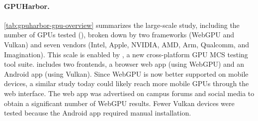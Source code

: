 \begin{table}
\centering
\footnotesize
\caption[GPUHarbor vendors and devices.]{The GPU vendors and devices included in the GPUHarbor study. Overall, almost 400 billion iterations of weak memory tests were run on \totalDevices devices, of which \uniqueDevices were confirmed to be unique models. Over 35 million weak behaviors were observed, with the rates per device and vendor characterized in \mysec\ref{sec:gpuharbor-wb-char}.}
\label{tab:gpuharbor-gpu-overview}
\end{table}

\paragraph{GPUHarbor.} \mytablong\ref{tab:gpuharbor-gpu-overview} summarizes the large-scale study, including the number of GPUs tested (\totalDevices), broken down by two frameworks (WebGPU and Vulkan) and seven vendors (Intel, Apple, NVIDIA, AMD, Arm, Qualcomm, and Imagination). This scale is enabled by \gpuharbor, a new cross-platform GPU MCS testing tool suite. \gpuharbor includes two frontends, a browser web app (using WebGPU) and an Android app (using Vulkan). Since WebGPU is now better supported on mobile devices, a similar study today could likely reach more mobile GPUs through the web interface. The web app was advertised on campus forums and social media to obtain a significant number of WebGPU results. Fewer Vulkan devices were tested because the Android app required manual installation.

